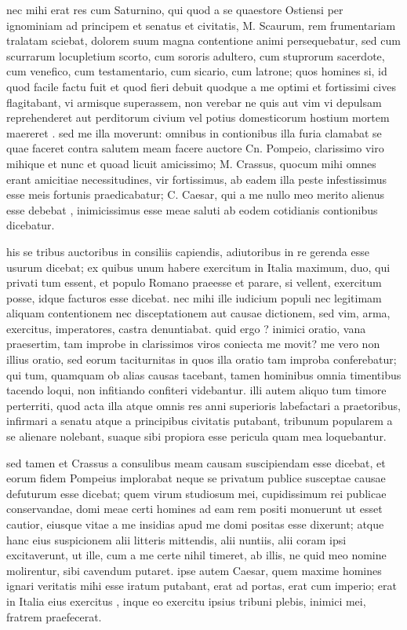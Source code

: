  nec mihi erat res cum Saturnino, qui quod a se quaestore Ostiensi per ignominiam ad principem et senatus et civitatis, M. Scaurum, rem frumentariam tralatam sciebat, dolorem suum magna contentione animi persequebatur, sed cum scurrarum locupletium scorto, cum sororis adultero, cum stuprorum sacerdote, cum venefico, cum testamentario, cum sicario, cum latrone; quos homines si, id quod facile factu fuit et quod fieri debuit quodque a me optimi et fortissimi cives flagitabant, vi armisque superassem, non verebar ne quis aut vim vi depulsam reprehenderet aut perditorum civium vel potius domesticorum hostium mortem maereret . sed me illa moverunt: omnibus in contionibus illa furia clamabat se quae faceret contra salutem meam facere auctore Cn. Pompeio, clarissimo viro mihique et nunc et quoad licuit amicissimo; M. Crassus, quocum mihi omnes erant amicitiae necessitudines, vir fortissimus, ab eadem illa peste infestissimus esse meis fortunis praedicabatur; C. Caesar, qui a me nullo meo merito alienus esse debebat , inimicissimus esse meae saluti ab eodem cotidianis contionibus dicebatur.

 his se tribus auctoribus in consiliis capiendis, adiutoribus in re gerenda esse usurum dicebat; ex quibus unum habere exercitum in Italia maximum, duo, qui privati tum essent, et populo Romano praeesse et parare, si vellent, exercitum posse, idque facturos esse dicebat. nec mihi ille iudicium populi nec legitimam aliquam contentionem nec disceptationem aut causae dictionem, sed vim, arma, exercitus, imperatores, castra denuntiabat. quid ergo ? inimici oratio, vana praesertim, tam improbe in clarissimos viros coniecta me movit? me vero non illius oratio, sed eorum taciturnitas in quos illa oratio tam improba conferebatur; qui tum, quamquam ob alias causas tacebant, tamen hominibus omnia timentibus tacendo loqui, non infitiando confiteri videbantur. illi autem aliquo tum timore perterriti, quod acta illa atque omnis res anni superioris labefactari a praetoribus, infirmari a senatu atque a principibus civitatis putabant, tribunum popularem a se alienare nolebant, suaque sibi propiora esse pericula quam mea loquebantur.

 sed tamen et Crassus a consulibus meam causam suscipiendam esse dicebat, et eorum fidem Pompeius implorabat neque se privatum publice susceptae causae defuturum esse dicebat; quem virum studiosum mei, cupidissimum rei publicae conservandae, domi meae certi homines ad eam rem positi monuerunt ut esset cautior, eiusque vitae a me insidias apud me domi positas esse dixerunt; atque hanc eius suspicionem alii litteris mittendis, alii nuntiis, alii coram ipsi excitaverunt, ut ille, cum a me certe nihil timeret, ab illis, ne quid meo nomine molirentur, sibi cavendum putaret. ipse autem Caesar, quem maxime homines ignari veritatis mihi esse iratum putabant, erat ad portas, erat cum imperio; erat in Italia eius exercitus , inque eo exercitu ipsius tribuni plebis, inimici mei, fratrem praefecerat.

